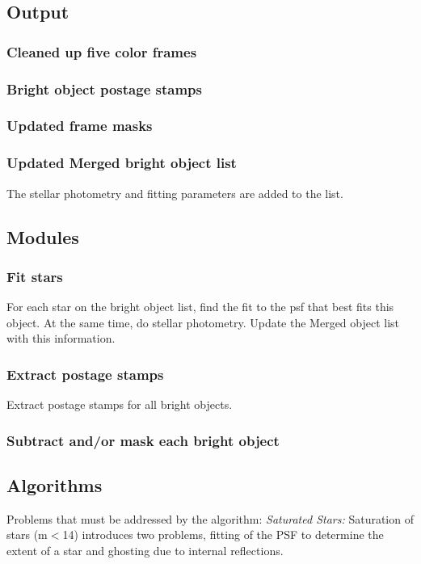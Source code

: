 \subsection{Output}

\subsubsection{Cleaned up five color frames}
\subsubsection{Bright object postage stamps}
\subsubsection{Updated frame masks}
\subsubsection{Updated Merged bright object list}
The stellar photometry and fitting parameters are added to the list.

\subsection{Modules}

\subsubsection{Fit stars}
For each star on the bright object list, find the fit to the psf that
best fits this object.  At the same time, do stellar photometry.
Update the Merged object list with this information.

\subsubsection{Extract postage stamps}
Extract postage stamps for all bright objects.

\subsubsection{Subtract and/or mask each bright object}

\subsection{Algorithms}

Problems that must be addressed by the algorithm:
{\it Saturated Stars:}
Saturation of stars (m$<$14) introduces two problems, fitting of the PSF to
determine the extent of a star and ghosting due to internal reflections.

